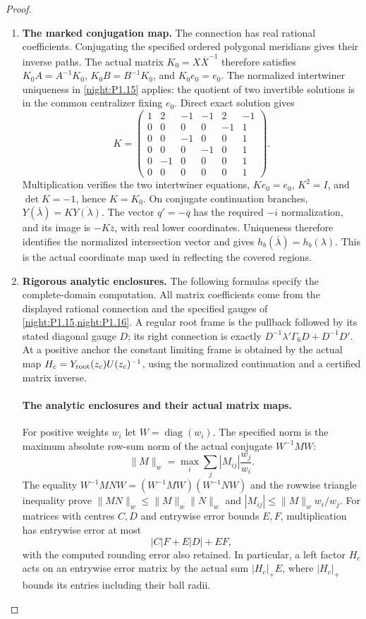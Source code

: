 \begin{proof}
\begin{enumerate}[label=\arabic*.]
\item \textbf{The marked conjugation map.}
The connection has real rational coefficients. Conjugating the
specified ordered polygonal meridians gives their inverse paths.
The actual matrix $K_0=X\overline X^{-1}$ therefore satisfies
$K_0A=A^{-1}K_0$, $K_0B=B^{-1}K_0$, and $K_0e_0=e_0$.
The normalized intertwiner uniqueness in \cref{night:P1.15}
applies: the quotient of two invertible solutions is in the
common centralizer fixing $e_0$. Direct exact solution gives
\[
 K=\begin{pmatrix}
 1&2&-1&-1&2&-1\\
 0&0&0&0&-1&1\\
 0&0&-1&0&0&1\\
 0&0&0&-1&0&1\\
 0&-1&0&0&0&1\\
 0&0&0&0&0&1
 \end{pmatrix}.
\]
Multiplication verifies the two intertwiner equations,
$Ke_0=e_0$, $K^2=I$, and $\det K=-1$, hence $K=K_0$.
On conjugate continuation branches,
$Y(\overline\lambda)=K\overline{Y(\lambda)}$.
The vector $q'=-\overline q$ has the required $-i$ normalization,
and its image is $-K\overline z$, with real lower coordinates.
Uniqueness therefore identifies the normalized intersection
vector and gives
$h_b(\overline\lambda)=h_b(\lambda)$.
This is the actual coordinate map used in reflecting the covered
regions.

\item \textbf{Rigorous analytic enclosures.}
The following formulas specify the complete-domain computation.
All matrix coefficients come from the displayed rational
connection and the specified gauges of
\cref{night:P1.15,night:P1.16}. A regular root frame is the
pullback followed by its stated diagonal gauge $D$; its right
connection is exactly
$D^{-1}\lambda'\Gamma_6D+D^{-1}D'$.
At a positive anchor the constant limiting frame is obtained by
the actual map $H_c=Y_{\rm root}(z_c)U(z_c)^{-1}$, using the
normalized continuation and a certified matrix inverse.

\paragraph{The analytic enclosures and their actual matrix maps.}
For positive weights $w_i$ let $W=\operatorname{diag}(w_i)$. The
specified norm is the maximum absolute row-sum norm of the actual
conjugate $W^{-1}MW$:
\[
 \|M\|_w=\max_i\sum_j|M_{ij}|\frac{w_j}{w_i}.
\]
The equality $W^{-1}MNW=(W^{-1}MW)(W^{-1}NW)$ and the rowwise
triangle inequality prove
$\|MN\|_w\le\|M\|_w\|N\|_w$ and
$|M_{ij}|\le\|M\|_w w_i/w_j$. For matrices with centres $C,D$
and entrywise error bounds $E,F$, multiplication has entrywise
error at most
\[
 |C|F+E|D|+EF,
\]
with the computed rounding error also retained. In particular, a
left factor $H_c$ acts on an entrywise error matrix by the actual
sum $|H_c|_+E$, where $|H_c|_+$ bounds its entries including their
ball radii.


\end{enumerate}
\end{proof}
